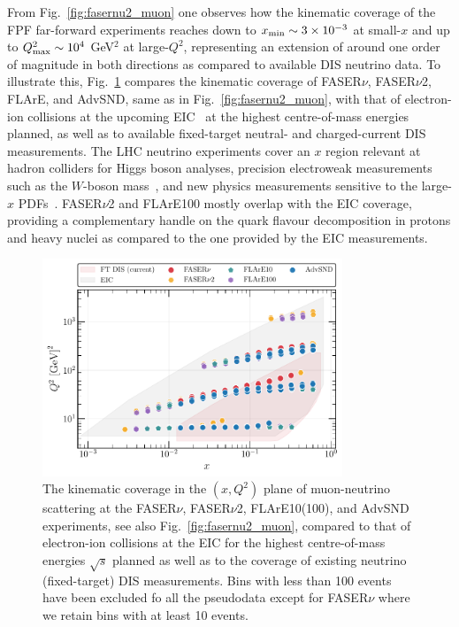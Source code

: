 From Fig.~\ref{fig:fasernu2_muon} one observes
how the kinematic coverage of the FPF far-forward experiments reaches down to
$x_{\rm min}\sim 3\times 10^{-3}$ at small-$x$ and up to $Q^2_{\rm max}\sim 10^4$ GeV$^2$
at large-$Q^2$, representing an extension
of around one order of magnitude in both directions as compared to available
DIS neutrino data.
%
To illustrate this,
Fig.~\ref{fig:Kin_nNNPDF30_EIC_FPF} compares
the kinematic coverage of FASER$\nu$, FASER$\nu$2, FLArE, and AdvSND, same as in
Fig.~\ref{fig:fasernu2_muon}, with that of electron-ion collisions
at the upcoming EIC~\cite{Khalek:2021ulf,AbdulKhalek:2021gbh} at the highest
centre-of-mass energies planned, as well as to available fixed-target
neutral- and charged-current DIS measurements.
%
The LHC neutrino experiments cover an $x$ region relevant
at hadron colliders for Higgs boson analyses,
precision electroweak measurements  such as the $W$-boson
mass~\cite{Amoroso:2023pey}, and new physics measurements sensitive
to the large-$x$ PDFs~\cite{Ball:2022qtp}.
%
FASER$\nu$2 and FLArE100 mostly overlap with the EIC coverage, providing a complementary handle
on the quark flavour decomposition in protons and heavy nuclei as compared
to the one provided by the EIC measurements.

\begin{figure}[t]
    \centering
    \includegraphics[width = 0.80\textwidth]{plots/KIN_DIS_FPF.pdf}
    \caption{
      The kinematic coverage in the $(x,Q^2)$ plane of muon-neutrino scattering
      at the FASER$\nu$, FASER$\nu$2, FLArE10(100), and AdvSND experiments, see also Fig.~\ref{fig:fasernu2_muon},
      compared to that of electron-ion collisions at the EIC for the highest centre-of-mass 
      energies $\sqrt{s}$ planned as well as to the coverage of existing neutrino
      (fixed-target) DIS measurements.
      Bins with less than 100 events have been excluded fo all the pseudodata except for FASER$\nu$ where we retain
      bins with at least 10 events.
    }
    \label{fig:Kin_nNNPDF30_EIC_FPF}
\end{figure}

